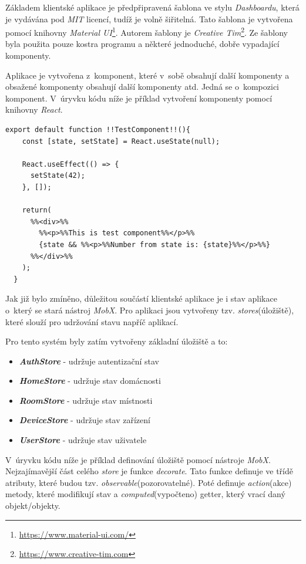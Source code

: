 Základem klientské aplikace je předpřipravená šablona ve stylu \emph{Dashboardu}, která je vydávána pod \emph{MIT} licencí, tudíž je volně šiřitelná.
Tato šablona je vytvořena pomocí knihovny \emph{Material UI}\footnote{\url{https://www.material-ui.com/}}. Autorem šablony je \emph{Creative Tim}\footnote{\url{https://www.creative-tim.com}}.
Ze šablony byla použita pouze kostra programu a některé jednoduché, dobře vypadající komponenty.

Aplikace je vytvořena z~komponent, které v~sobě obsahují další komponenty a obsažené komponenty obsahují další komponenty atd.
Jedná se o~kompozici komponent.
V~úryvku kódu níže je příklad vytvoření komponenty pomocí knihovny \emph{React}.

\begin{lstlisting}[style=JavaScriptStyle,caption={Ukázka definování komponenty}]
  export default function !!TestComponent!!(){
    const [state, setState] = React.useState(null);

    React.useEffect(() => {
      setState(42);
    }, []);
    
    return(
      %%<div>%%
        %%<p>%%This is test component%%</p>%%
        {state && %%<p>%%Number from state is: {state}%%</p>%%}
      %%</div>%%
    );
  }
\end{lstlisting}

Jak již bylo zmíněno, důležitou součástí klientské aplikace je i stav aplikace o~který se stará nástroj \emph{MobX}.
Pro aplikaci jsou vytvořeny tzv. \emph{stores}(úložiště), které slouží pro udržování stavu napříč aplikací.
\newline

Pro tento systém byly zatím vytvořeny základní úložiště a to:
\begin{itemize}
  \item \textbf{\emph{AuthStore}} - udržuje autentizační stav
  \item \textbf{\emph{HomeStore}} - udržuje stav domácnosti
  \item \textbf{\emph{RoomStore}} - udržuje stav místnosti
  \item \textbf{\emph{DeviceStore}} - udržuje stav zařízení
  \item \textbf{\emph{UserStore}} - udržuje stav uživatele
\end{itemize}

\newpage
V~úryvku kódu níže je příklad definování úložiště pomocí nástroje \emph{MobX}.
Nejzajímavější část celého \emph{store} je funkce \emph{decorate}.
Tato funkce definuje ve třídě atributy, které budou tzv. \emph{observable}(pozorovatelné).
Poté definuje \emph{action}(akce) metody,
které modifikují stav a \emph{computed}(vypočteno) getter, který vrací daný objekt/objekty.

